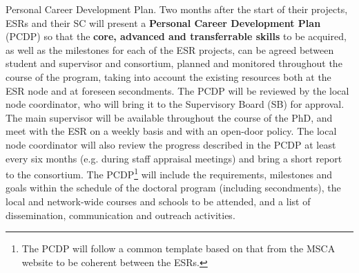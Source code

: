 \noindent \color{blue}Personal Career Development Plan. \color{black}
Two months after the start of their projects, ESRs and their SC will present a \textbf{Personal Career Development Plan} (PCDP) so that the \textbf{core, advanced and transferrable skills} to be acquired, as well as the milestones for each of the ESR projects, can be agreed between student and supervisor and consortium, planned and monitored throughout the course of the program, taking into account the existing resources both at the ESR node and at foreseen secondments. The PCDP will be reviewed by the local node coordinator, who will bring it to the Supervisory Board (SB) for approval. The main supervisor will be available throughout the course of the PhD, and meet with the ESR on a weekly basis and with an open-door policy. 
The local node coordinator will also review the progress described in the PCDP at least every six months (e.g. during staff appraisal meetings) and bring a short report to the consortium. 
The PCDP\footnote{The \acronym PCDP will follow a common template based on that from the MSCA website to be coherent between the ESRs.} will include the requirements, milestones and goals within the schedule of the doctoral program (including secondments), the local and network-wide courses and schools to be attended, and a list of dissemination, communication and outreach activities. 



